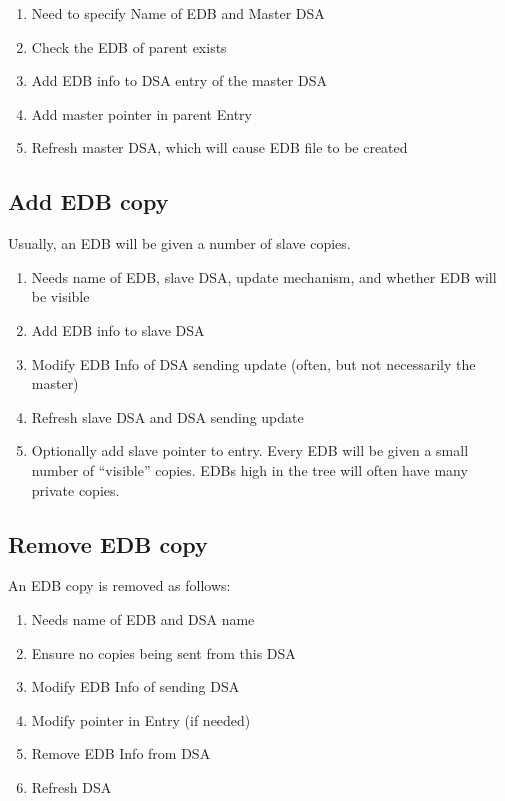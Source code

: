 \begin {enumerate}
\item Need to specify Name of EDB and Master DSA
\item Check the EDB of parent exists
\item Add EDB info to DSA entry of the master DSA
\item Add master pointer in parent Entry
\item Refresh master DSA, which will cause EDB file to be created
\end {enumerate}


\subsection {Add EDB copy}

Usually, an EDB will be given a number of slave copies.

\begin {enumerate}
\item Needs name of EDB, slave DSA, update mechanism, and whether EDB will be visible
\item Add EDB info to slave DSA
\item Modify EDB Info of DSA sending update (often, but not necessarily the
master)
\item Refresh slave DSA and DSA sending update
\item Optionally add slave pointer to entry.  Every EDB will be given a
small number of ``visible'' copies.  EDBs high in the tree will often have
many private copies.   

\end {enumerate}

\subsection {Remove EDB copy}

An EDB copy is removed as follows:

\begin {enumerate}
\item Needs name of EDB and DSA name
\item Ensure no copies being sent from this DSA
\item Modify EDB Info of sending DSA
\item Modify pointer in Entry (if needed)
\item Remove EDB Info from DSA
\item Refresh DSA

\end {enumerate}

